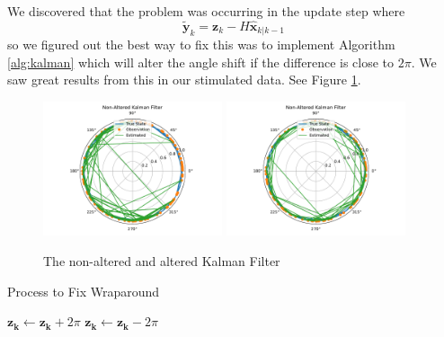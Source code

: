 \documentclass[11pt]{amsart}
\begin{document}
We discovered that the problem was occurring in the update step where \[\mathbf{\tilde{y}}_k = \mathbf{z}_k - H\mathbf{\hat{x}}_{k|k-1}\]
so we figured out the best way to fix this was to implement Algorithm \ref{alg:kalman} which will alter the angle shift if the difference is close 
to $2\pi$. We saw great results from this in our stimulated data.
See Figure \ref{fig:simple_kalman}.

\begin{figure}[htp]
    \centering
    \includegraphics[width=0.47\textwidth]{non_altered_kalman.pdf}\hfill
    \includegraphics[width=0.47\textwidth]{altered_kalman.pdf}\hfill
    \caption{The non-altered and altered Kalman Filter}
    \label{fig:simple_kalman}
\end{figure}



\begin{algorithm}
    \caption{Process to Fix Wraparound}\label{alg:kalman}    
    \begin{algorithmic}
            \State $\mathbf{z_k} \gets \mathbf{z_k} + 2\pi$
            \State $\mathbf{z_k} \gets \mathbf{z_k} - 2\pi$
        \EndIf 
        \end{algorithmic}
    \end{algorithm}

\end{document}
